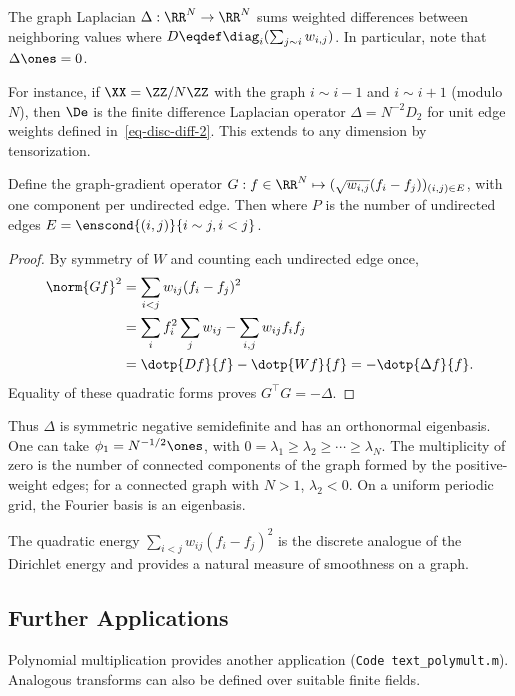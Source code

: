 The graph Laplacian $\Delta:\RR^N\to\RR^N$ sums weighted differences between neighboring values
where $D \eqdef \diag_i(\sum_{j \sim i} w_{i,j})$. In particular, note that $\Delta\ones=0$.

For instance, if $\XX = \ZZ/N\ZZ$ with the graph $i \sim i-1$ and $i \sim i+1$ (modulo $N$), then $\De$ is the finite difference Laplacian operator $\Delta=N^{-2}D_2$ for unit edge weights defined in~\eqref{eq-disc-diff-2}. This extends to any dimension by tensorization.

\begin{prop}
Define the graph-gradient operator $G : f \in \RR^N \mapsto ( \sqrt{w_{i,j}} (f_i-f_j) )_{(i,j)\in E}$, with one component per undirected edge. Then
where $P$ is the number of undirected edges $E=\enscond{(i,j)}{i \sim j, i<j}$.
\end{prop}
\begin{proof}
By symmetry of $W$ and counting each undirected edge once,
\begin{align*}
 \norm{Gf}^2
 &=\sum_{i<j}w_{ij}(f_i-f_j)^2\\
 &=\sum_i f_i^2\sum_jw_{ij}-\sum_{i,j}w_{ij}f_if_j\\
 &=\dotp{Df}{f}-\dotp{Wf}{f}=-\dotp{\Delta f}{f}.
\end{align*}
Equality of these quadratic forms proves $G^\top G=-\Delta$.
\end{proof}

Thus $\Delta$ is symmetric negative semidefinite and has an orthonormal eigenbasis. One can take $\phi_1=N^{-1/2}\ones$, with $0=\lambda_1\geq\lambda_2\geq\cdots\geq\lambda_N$. The multiplicity of zero is the number of connected components of the graph formed by the positive-weight edges; for a connected graph with $N>1$, $\lambda_2<0$. On a uniform periodic grid, the Fourier basis is an eigenbasis.

The quadratic energy $\sum_{i<j}w_{ij}(f_i-f_j)^2$ is the discrete analogue of the Dirichlet energy and provides a natural measure of smoothness on a graph.



\subsection{Further Applications}

Polynomial multiplication provides another application (\texttt{Code text\_polymult.m}).
%
Analogous transforms can also be defined over suitable finite fields.
